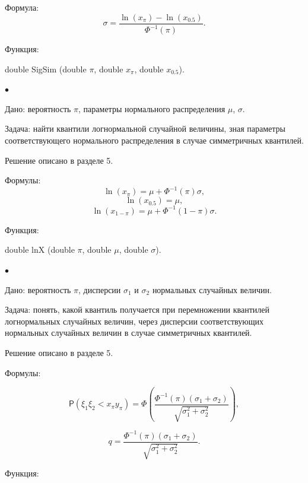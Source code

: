 \documentclass[12pt]{article}
\begin{document}
	Формула:
	\begin{equation*}
		\sigma=\frac{\ln(x_{\pi})-\ln(x_{0.5})}{\Phi^{-1}(\pi)}.
	\end{equation*}
	
	Функция:
	
	double SigSim (double $\pi$, double $x_{\pi}$, double $x_{0.5}$).
	
	
	$\bullet$
	
	Дано:
	вероятность $\pi$, параметры нормального распределения $\mu$, $\sigma$.
	
	Задача:
	найти квантили логнормальной случайной величины, зная параметры соответствующего нормального распределения в случае симметричных квантилей. 
	
	Решение описано в разделе 5.
	
	Формулы:
	\begin{equation*}
		\ln(x_{\pi})=\mu+\Phi^{-1}(\pi)\sigma,
	\end{equation*}
	\begin{equation*}
		\ln(x_{0.5})=\mu,
	\end{equation*}
	\begin{equation*}
		\ln(x_{1-\pi})=\mu+\Phi^{-1}(1-\pi)\sigma.
	\end{equation*}
	
	Функция:
	
	double lnX (double $\pi$, double $\mu$, double $\sigma$).
	
	$\bullet$
	
	Дано:
	вероятность $\pi$, дисперсии $\sigma_{1}$ и $\sigma_{2}$ нормальных случайных величин.
	
	Задача:
	понять, какой квантиль получается при перемножении квантилей логнормальных случайных величин, через дисперсии соответствующих нормальных случайных величин в случае симметричных квантилей.
	
	Решение описано в разделе 5.
	
	Формулы:
	
	\begin{equation*}
		\mathsf{P}(\xi_{1}\xi_{2}< x_{\pi}y_{\pi}) = \Phi\left(\frac{\Phi^{-1}(\pi)(\sigma_{1}+\sigma_{2})}{\sqrt{\sigma_{1}^{2}+\sigma_{2}^{2}}}\right),
	\end{equation*}
	
	\begin{equation*}
		q =\frac{\Phi^{-1}(\pi)(\sigma_{1}+\sigma_{2})}{\sqrt{\sigma_{1}^{2}+\sigma_{2}^{2}}}.
	\end{equation*}
	
	Функция:
	
\end{document}
